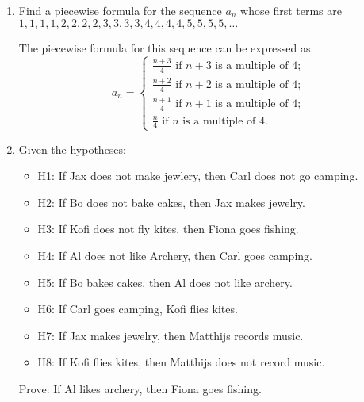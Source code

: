 \documentclass{article}
\begin{document}
\begin{enumerate}

    \item Find a piecewise formula for the sequence $a_n$ whose first terms are\vskip1pt
          $1,1,1,1,2,2,2,2,3,3,3,3,4,4,4,4,5,5,5,5,\dots$

          The piecewise formula for this sequence can be expressed as:
          \[
              a_n = \begin{cases}
                  \frac{n + 3}{4} \text{ if } n + 3 \text{ is a multiple of } 4; \\
                  \frac{n + 2}{4} \text{ if } n + 2 \text{ is a multiple of } 4; \\
                  \frac{n + 1}{4} \text{ if } n + 1 \text{ is a multiple of } 4; \\
                  \frac{n}{4} \text{ if } n \text{ is a multiple of } 4.
              \end{cases}
          \]

          \newpage

    \item Given the hypotheses:
          \begin{itemize}
              \item H1: If Jax does not make jewlery, then Carl does not go camping. 
              \item H2: If Bo does not bake cakes, then Jax makes jewelry. 
              \item H3: If Kofi does not fly kites, then Fiona goes fishing. 
              \item H4: If Al does not like Archery, then Carl goes camping. 
              \item H5: If Bo bakes cakes, then Al does not like archery. 
              \item H6: If Carl goes camping, Kofi flies kites. 
              \item H7: If Jax makes jewelry, then Matthijs records music. 
              \item H8: If Kofi flies kites, then Matthijs does not record music. 
          \end{itemize}
          Prove: If Al likes archery, then Fiona goes fishing.


\end{enumerate}
\end{document}
